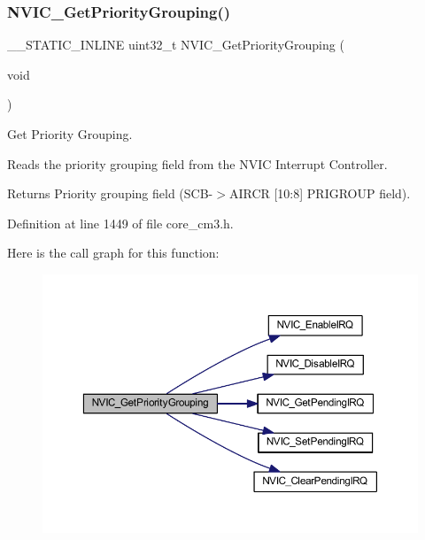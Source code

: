 \subsubsection{\texorpdfstring{N\+V\+I\+C\+\_\+\+Get\+Priority\+Grouping()}{NVIC\_GetPriorityGrouping()}}
{\footnotesize\ttfamily \+\_\+\+\_\+\+S\+T\+A\+T\+I\+C\+\_\+\+I\+N\+L\+I\+NE uint32\+\_\+t N\+V\+I\+C\+\_\+\+Get\+Priority\+Grouping (\begin{DoxyParamCaption}\item[{void}]{ }\end{DoxyParamCaption})}



Get Priority Grouping. 

Reads the priority grouping field from the N\+V\+IC Interrupt Controller. \begin{DoxyReturn}{Returns}
Priority grouping field (S\+C\+B-\/$>$A\+I\+R\+CR \mbox{[}10\+:8\mbox{]} P\+R\+I\+G\+R\+O\+UP field). 
\end{DoxyReturn}


Definition at line 1449 of file core\+\_\+cm3.\+h.

Here is the call graph for this function\+:
\nopagebreak
\begin{figure}[H]
\begin{center}
\leavevmode
\includegraphics[width=350pt]{group___c_m_s_i_s___core___n_v_i_c_functions_ga394f7ce2ca826c0da26284d17ac6524d_cgraph}
\end{center}
\end{figure}
\mbox{\label{group___c_m_s_i_s___core___n_v_i_c_functions_ga3ecf446519da33e1690deffbf5be505f}} 
